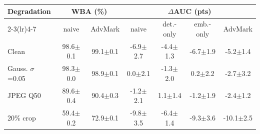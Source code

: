 \begin{tabular}{@{}lcccccc@{}}
\toprule
Degradation & \multicolumn{2}{c}{WBA (\%)} & \multicolumn{4}{c}{$\Delta$AUC (pts)} \\
\cmidrule(lr){2-3}\cmidrule(lr){4-7}
 & naive & AdvMark & naive & det.-only & emb.-only & AdvMark \\
\midrule
Clean & 98.6$\pm$0.1 & 99.1$\pm$0.1 & -6.9$\pm$2.7 & -4.4$\pm$1.3 & -6.7$\pm$1.9 & -5.2$\pm$1.4 \\
Gauss. $\sigma$=0.05 & 98.3$\pm$0.0 & 98.9$\pm$0.1 & 0.0$\pm$2.1 & -1.3$\pm$2.0 & 0.2$\pm$2.2 & -2.7$\pm$3.2 \\
JPEG Q50 & 89.6$\pm$0.4 & 90.4$\pm$0.3 & -1.2$\pm$2.1 & 1.1$\pm$1.4 & -1.2$\pm$1.9 & -2.4$\pm$1.2 \\
20\% crop & 59.4$\pm$0.2 & 72.9$\pm$0.1 & -9.8$\pm$3.5 & -6.4$\pm$1.4 & -9.3$\pm$3.6 & -10.1$\pm$2.5 \\
\bottomrule
\end{tabular}
